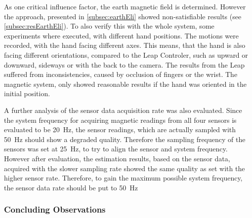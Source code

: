 As one critical influence factor, the earth magnetic field is determined. However the approach, presented in \ref{subsec:earthEli} showed non-satisfiable results (see \ref{subsec:resEarthEli}). To also verify this with the whole system, some experiments where executed, with different hand positions. The motions were recorded, with the hand facing different axes. This means, that the hand is also facing different orientations, compared to the Leap Controler, such as upward or downward, sideways or with the back to the camera. The results from the Leap suffered from inconsistencies, caused by occlusion of fingers or the wrist. The magnetic system, only showed reasonable results if the hand was oriented in the initial position.

A further analysis of the sensor data acquisition rate was also evaluated. Since the system frequency for acquiring magnetic readings from all four sensors is evaluated to be \SI{20}{\Hz}, the sensor readings, which are actually sampled with \SI{50}{\Hz} should show a degraded quality. Therefore the sampling frequency of the sensors was set at \SI{25}{\Hz}, to try to align the sensor and system frequency. However after evaluation, the estimation results, based on the sensor data, acquired with the slower sampling rate showed the same quality as set with the higher sensor rate. Therefore, to gain the maximum possible system frequency, the sensor data rate should be put to \SI{50}{\Hz}

\FloatBarrier
\subsubsection{Concluding Observations}

